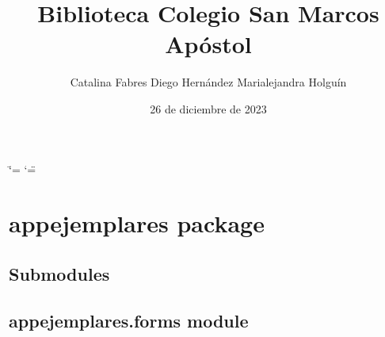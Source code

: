 \documentclass[letterpaper,10pt,spanish]{sphinxmanual}
\title{Biblioteca Colegio San Marcos Apóstol}
\date{26 de diciembre de 2023}
\author{Catalina Fabres \sphinxhyphen{} Diego Hernández \sphinxhyphen{} Marialejandra Holguín}
\begin{document}
\ifdefined\shorthandoff
  \ifnum\catcode`\=\string=\active\shorthandoff{=}\fi
  \ifnum\catcode`\"=\active{}\fi
\fi

\pagestyle{empty}
\sphinxmaketitle
\pagestyle{plain}
\sphinxtableofcontents
\pagestyle{normal}
\label{\detokenize{index::doc}}


\sphinxstepscope


\chapter{appejemplares package}
\label{\detokenize{modules/appejemplares:appejemplares-package}}\label{\detokenize{modules/appejemplares::doc}}

\section{Submodules}
\label{\detokenize{modules/appejemplares:submodules}}

\section{appejemplares.forms module}
\label{\detokenize{modules/appejemplares:module-appejemplares.forms}}\label{\detokenize{modules/appejemplares:appejemplares-forms-module}}
\end{document}
